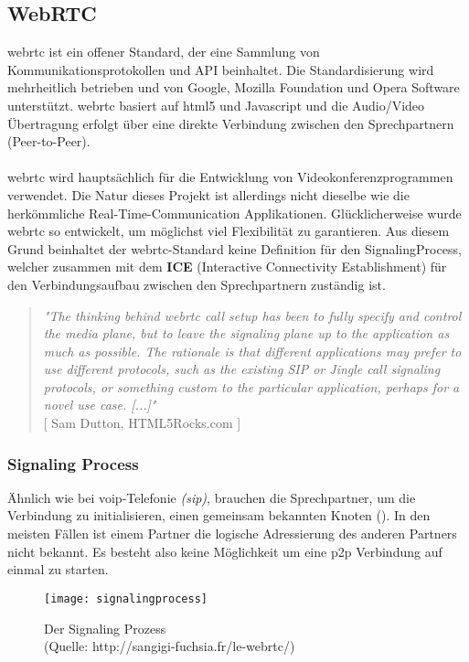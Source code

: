 \subsection{WebRTC}
\label{kap:webrtc}
\gls{webrtc} ist ein offener Standard, der eine Sammlung von Kommunikationsprotokollen und API beinhaltet. Die Standardisierung wird mehrheitlich betrieben und von Google, Mozilla Foundation und Opera Software unterstützt. \gls{webrtc} basiert auf \gls{html}5 und Javascript und die Audio/Video Übertragung erfolgt über eine direkte Verbindung zwischen den Sprechpartnern (Peer-to-Peer).
\\
\\
\gls{webrtc} wird hauptsächlich für die Entwicklung von Videokonferenzprogrammen verwendet. Die Natur dieses Projekt ist allerdings nicht dieselbe wie die herkömmliche Real-Time-Communication Applikationen. Glücklicherweise wurde \gls{webrtc} so entwickelt, um möglichst viel Flexibilität zu garantieren. Aus diesem Grund beinhaltet der \gls{webrtc}-Standard keine Definition für den SignalingProcess, welcher zusammen mit dem \textbf{ICE} (Interactive Connectivity Establishment) für den Verbindungsaufbau zwischen den Sprechpartnern zuständig ist.

\begin{quote}
	\textit{
		"The thinking behind \gls{webrtc} call setup has been to fully specify and control the media plane, but to leave the signaling plane up to the application as much as possible. The rationale is that different applications may prefer to use different protocols, such as the existing SIP or Jingle call signaling protocols, or something custom to the particular application, perhaps for a novel use case. [...]"
	} 
	\\
	\nocite{} [ Sam Dutton, HTML5Rocks.com ]
\end{quote}

\subsubsection{Signaling Process}
\label{kap:signaling}
Ähnlich wie bei \gls{voip}-Telefonie \textit{(\gls{sip})}, brauchen die Sprechpartner, um die Verbindung zu initialisieren, einen gemeinsam bekannten Knoten (). In den meisten Fällen ist einem Partner die logische Adressierung des anderen Partners nicht bekannt. Es besteht also keine Möglichkeit um eine \gls{p2p} Verbindung auf einmal zu starten.

\begin{figure}[htb!]
	\begin{center}
		\texttt{[image: signalingprocess]}
		\caption[Der Signaling Prozess]{Der Signaling Prozess \\ (Quelle: http://sangigi-fuchsia.fr/le-webrtc/)}
		\label{fig:signaling}
	\end{center}
\end{figure}

